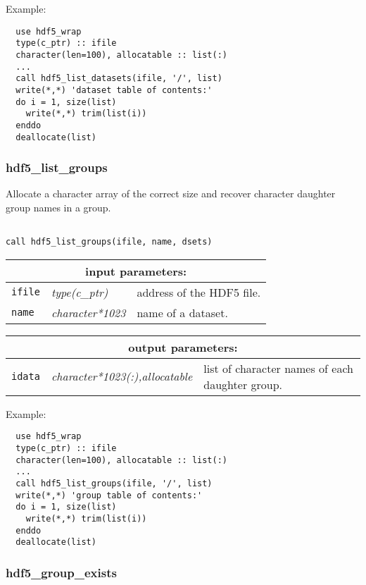 \vskip 0.5cm

\noindent Example:
\begin{verbatim}
  use hdf5_wrap
  type(c_ptr) :: ifile
  character(len=100), allocatable :: list(:)
  ...
  call hdf5_list_datasets(ifile, '/', list)
  write(*,*) 'dataset table of contents:'
  do i = 1, size(list)
    write(*,*) trim(list(i))
  enddo
  deallocate(list)
\end{verbatim}

\subsubsection{hdf5\_list\_groups}

Allocate a character array of the correct size and recover character daughter group names in a group.

\begin{verbatim}

call hdf5_list_groups(ifile, name, dsets)
\end{verbatim}

\noindent
\begin{tabular}{|p{1.5cm}|p{3cm}|p{10cm}|}
\hline
\multicolumn{3}{|c|}{\bf input parameters:} \\
\hline
{\tt ifile} & {\it type(c\_ptr)} & address of the HDF5 file. \\
\hline
{\tt name} & {\it character*1023} & name of a dataset. \\
\hline
\end{tabular}

\vskip 0.8cm

\noindent
\begin{tabular}{|p{1.5cm}|p{4.5cm}|p{8.5cm}|}
\hline
\multicolumn{3}{|c|}{\bf output parameters:} \\
\hline
{\tt idata} & {\it character*1023(:),allocatable} & list of character names of each daughter group.\\
\hline
\end{tabular}

\vskip 0.5cm

\noindent Example:
\begin{verbatim}
  use hdf5_wrap
  type(c_ptr) :: ifile
  character(len=100), allocatable :: list(:)
  ...
  call hdf5_list_groups(ifile, '/', list)
  write(*,*) 'group table of contents:'
  do i = 1, size(list)
    write(*,*) trim(list(i))
  enddo
  deallocate(list)
\end{verbatim}

\subsubsection{hdf5\_group\_exists}

